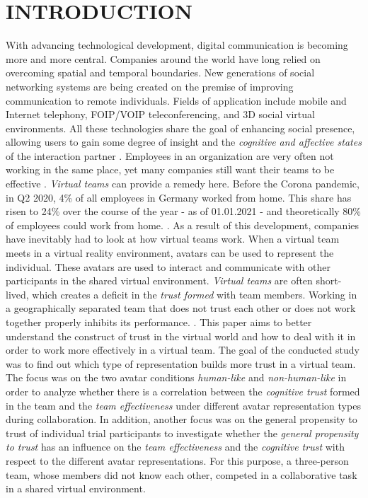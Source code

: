 \documentclass[sigchi]{acmart}
\begin{document}
\maketitle

\section{INTRODUCTION}
With advancing technological development, digital communication is becoming more and more central. Companies around the world have long relied on overcoming spatial and temporal boundaries.
New generations of social networking systems are being created on the premise of improving communication to remote individuals.
Fields of application include mobile and Internet telephony, FOIP/VOIP teleconferencing, and 3D social virtual environments.
All these technologies share the goal of enhancing social presence, allowing users to gain some degree of insight and the \textit{cognitive and affective states} of the interaction partner \citep[p. 3]{biocca2002defining}.
Employees in an organization are very often not working in the same place, yet many companies still want their teams to be effective \citep[p. 791-792]{jarvenpaa1999communication}. \textit{Virtual teams} can provide a remedy here. 
Before the Corona pandemic, in Q2 2020, 4\% of all employees in Germany worked from home. This share has risen to 24\% over the course of the year - as of 01.01.2021 - and theoretically 80\% of employees could work from home. \citep{statistaCorona2020}. As a result of this development, companies have inevitably had to look at how virtual teams work.
When a virtual team meets in a virtual reality environment, avatars can be used to represent the individual. These avatars are used to interact and communicate with other participants in the shared virtual environment.
\textit{Virtual teams} are often short-lived, which creates a deficit in the \textit{trust formed} with team members.
Working in a geographically separated team that does not trust each other or does not work together properly inhibits its performance. \citep[p. 98-107]{huang1998supporting} \citep[p. 399-417]{turoff1993distributed}. This paper aims to better understand the construct of trust in the virtual world and how to deal with it in order to work more effectively in a virtual team.
The goal of the conducted study was to find out which type of representation builds more trust in a virtual team. The focus was on the two avatar conditions \textit{human-like} and \textit{non-human-like} in order to analyze whether there is a correlation between the \textit{cognitive trust} formed in the team and the \textit{team effectiveness} under different avatar representation types during collaboration.
In addition, another focus was on the general propensity to trust of individual trial participants to investigate whether the \textit{general propensity to trust} has an influence on the \textit{team effectiveness} and the \textit{cognitive trust} with respect to the different avatar representations. For this purpose, a three-person team, whose members did not know each other, competed in a collaborative task in a shared virtual environment.
\end{document}
